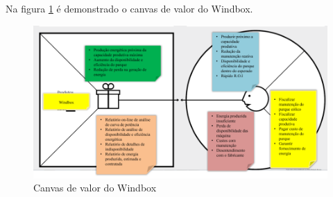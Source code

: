 Na figura \ref{Fig:canvas-valor-windbox} é demonstrado o canvas de valor do Windbox.

\begin{figure}[htbp!] \begin{center}
\includegraphics[width=1\linewidth]{./figuras/canvas-de-valor}
\caption{Canvas de valor do Windbox}
\label{Fig:canvas-valor-windbox}
\end{center} 
\end{figure}
